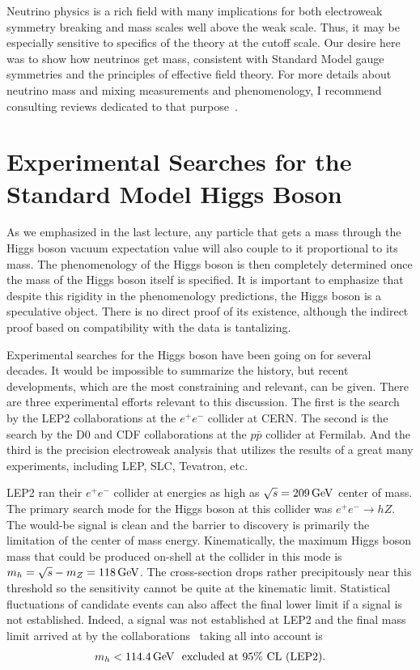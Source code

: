 \documentclass[12pt]{article}
\def\beq{\begin{eqnarray}}
\def\eeq{\end{eqnarray}}
\def\xsection#1{\section{#1}}
\def\gev{\, {\rm GeV}}
\begin{document}
Neutrino physics is a rich field with many implications for both electroweak symmetry breaking and mass scales well above the weak scale. Thus, it may be especially sensitive to specifics of the theory at the cutoff scale.  Our desire here was to show how neutrinos get mass, consistent with Standard Model gauge symmetries and the principles of effective field theory. For more details about neutrino mass and mixing measurements and phenomenology, I recommend consulting reviews dedicated to that purpose~\cite{neutrino reviews, Kayser PDG}.


\xsection{Experimental Searches for the Standard Model Higgs Boson}

As we emphasized in the last lecture, any particle that gets a mass through the Higgs boson vacuum expectation value will also couple to it proportional to its mass. The phenomenology of the Higgs boson is then completely determined once the mass of the Higgs boson itself is specified. It is important to emphasize that despite this rigidity in the phenomenology predictions, the Higgs boson is a speculative object. There is no direct proof of its existence, although the indirect proof based on compatibility with the data is tantalizing.  

Experimental searches for the Higgs boson have been going on for several decades. It would be impossible to summarize the history, but recent developments, which are the most constraining and relevant, can be given. There are three experimental efforts relevant to this discussion. The first is the search by the LEP2 collaborations at the $e^+e^-$ collider at CERN. The second is the search by the D0 and CDF collaborations at the $p\bar p$ collider at Fermilab. And the third is the precision electroweak analysis that utilizes the results of a great many experiments, including LEP, SLC, Tevatron, etc.

LEP2 ran their $e^+e^-$ collider at energies as high as $\sqrt{s}=209\gev$ center of mass.  The primary search mode for the Higgs boson at this collider was $e^+e^-\to hZ$. The would-be signal is clean and the barrier to discovery is primarily the limitation of the center of mass energy. Kinematically, the maximum Higgs boson mass that could be produced on-shell at the collider in this mode is $m_h=\sqrt{s}-m_Z=118\gev$. The cross-section drops rather precipitously near this threshold so the sensitivity cannot be quite at the kinematic limit. Statistical fluctuations of candidate events can also affect the final lower limit if a signal is not established. Indeed, a signal was not established at LEP2 and the final mass limit arrived at by the collaborations~\cite{Barate:2003sz} taking all into account is
\beq
m_h< 114.4\gev~~{\rm excluded~ at}~95\% ~{\rm CL}~{\rm (LEP2)}.
\eeq
\end{document}
